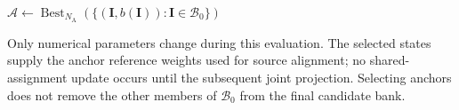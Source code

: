 \begin{algorithm}[htbp]
    \small
    \DontPrintSemicolon
    \SetAlgoNoEnd
    $\mathcal A\leftarrow\operatorname{Best}_{N_{\mathrm A}}
        (\{(\mathbf I,b(\mathbf I)):\mathbf I\in\mathcal B_0\})$\;
    \;
    \caption{Numerical evaluation and anchor selection}
    \label{alg:anchor-preparation}
\end{algorithm}

Only numerical parameters change during this evaluation. The selected
states supply the anchor reference weights used for source alignment;
no shared-assignment update occurs until the subsequent joint
projection. Selecting anchors does not remove the other members of
$\mathcal B_0$ from the final candidate bank.

